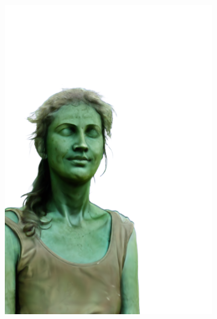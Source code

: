\begin{figure}[ht]
\begin{subfigure}{0.08\linewidth}
        \includegraphics[width=\textwidth]{Figures/results/high/dora_stone/11_render.png}

\end{subfigure}
\end{figure}
